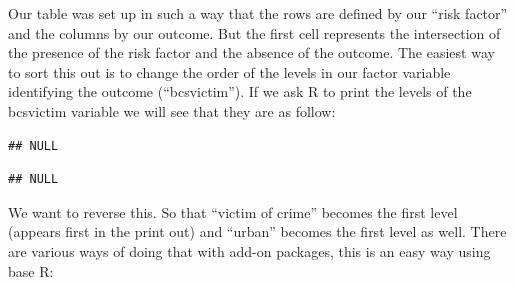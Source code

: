 \documentclass[
]{book}
\newenvironment{Shaded}{\begin{snugshade}}{\end{snugshade}}
\newcommand{\AttributeTok}[1]{\textcolor[rgb]{0.77,0.63,0.00}{#1}}
\newcommand{\FunctionTok}[1]{\textcolor[rgb]{0.00,0.00,0.00}{#1}}
\newcommand{\NormalTok}[1]{#1}
\newcommand{\OtherTok}[1]{\textcolor[rgb]{0.56,0.35,0.01}{#1}}
\newcommand{\SpecialCharTok}[1]{\textcolor[rgb]{0.00,0.00,0.00}{#1}}
\newcommand{\StringTok}[1]{\textcolor[rgb]{0.31,0.60,0.02}{#1}}
\begin{document}
Our table was set up in such a way that the rows are defined by our ``risk factor'' and the columns by our outcome. But the first cell represents the intersection of the presence of the risk factor and the absence of the outcome. The easiest way to sort this out is to change the order of the levels in our factor variable identifying the outcome (``bcsvictim''). If we ask R to print the levels of the bcsvictim variable we will see that they are as follow:

\begin{Shaded}
\end{Shaded}

\begin{verbatim}
## NULL
\end{verbatim}

\begin{Shaded}
\end{Shaded}

\begin{verbatim}
## NULL
\end{verbatim}

We want to reverse this. So that ``victim of crime'' becomes the first level (appears first in the print out) and ``urban'' becomes the first level as well. There are various ways of doing that with add-on packages, this is an easy way using base R:

\begin{Shaded}
\end{Shaded}
\end{document}
